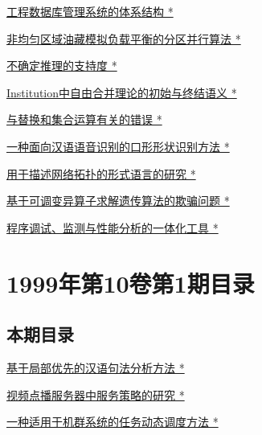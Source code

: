\documentclass[a4paper]{article}
\begin{document}
\href{http://www.jos.org.cn/ch/reader/download_pdf.aspx?file_no=19990213&year_id=1999&quarter_id=2&falg=1}{工程数据库管理系统的体系结构 *}

\href{http://www.jos.org.cn/ch/reader/download_pdf.aspx?file_no=19990214&year_id=1999&quarter_id=2&falg=1}{非均匀区域油藏模拟负载平衡的分区并行算法 *}

\href{http://www.jos.org.cn/ch/reader/download_pdf.aspx?file_no=19990215&year_id=1999&quarter_id=2&falg=1}{不确定推理的支持度 *}

\href{http://www.jos.org.cn/ch/reader/download_pdf.aspx?file_no=19990216&year_id=1999&quarter_id=2&falg=1}{Institution中自由合并理论的初始与终结语义 *}

\href{http://www.jos.org.cn/ch/reader/download_pdf.aspx?file_no=19990217&year_id=1999&quarter_id=2&falg=1}{与替换和集合运算有关的错误 *}

\href{http://www.jos.org.cn/ch/reader/download_pdf.aspx?file_no=19990218&year_id=1999&quarter_id=2&falg=1}{一种面向汉语语音识别的口形形状识别方法 *}

\href{http://www.jos.org.cn/ch/reader/download_pdf.aspx?file_no=19990219&year_id=1999&quarter_id=2&falg=1}{用于描述网络拓扑的形式语言的研究 *}

\href{http://www.jos.org.cn/ch/reader/download_pdf.aspx?file_no=19990220&year_id=1999&quarter_id=2&falg=1}{基于可调变异算子求解遗传算法的欺骗问题 *}

\href{http://www.jos.org.cn/ch/reader/download_pdf.aspx?file_no=19990221&year_id=1999&quarter_id=2&falg=1}{程序调试、监测与性能分析的一体化工具 *}


\section{\textbf{1999年第10卷第1期目录}}
\subsection{本期目录}
\href{http://www.jos.org.cn/ch/reader/download_pdf.aspx?file_no=19990101&year_id=1999&quarter_id=1&falg=1}{基于局部优先的汉语句法分析方法 *}

\href{http://www.jos.org.cn/ch/reader/download_pdf.aspx?file_no=19990103&year_id=1999&quarter_id=1&falg=1}{视频点播服务器中服务策略的研究 *}

\href{http://www.jos.org.cn/ch/reader/download_pdf.aspx?file_no=19990104&year_id=1999&quarter_id=1&falg=1}{一种适用于机群系统的任务动态调度方法 *}
\end{document}
